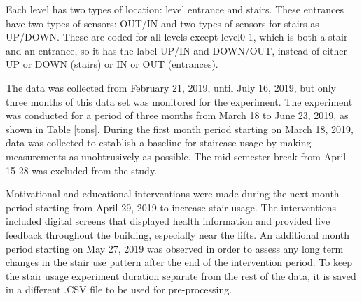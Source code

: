 Each level has two types of location: level entrance and stairs. These entrances have two types of sensors: OUT/IN and two types of sensors for stairs as UP/DOWN. These are coded for all levels except level0-1, which is both a stair and an entrance, so it has the label UP/IN and DOWN/OUT, instead of either UP or DOWN (stairs) or IN or OUT (entrances).



The data was collected from February 21, 2019, until July 16, 2019, but only three months of this data set was monitored for the experiment. The experiment was conducted for a period of three months from March 18 to June 23, 2019, as shown in Table \ref{tons}. During the first month period starting on March 18, 2019, data was collected to establish a baseline for staircase usage by making measurements as unobtrusively as possible. The mid-semester break from April 15-28 was excluded from the study. 

Motivational and educational interventions were made during the next month period starting from April 29, 2019 to increase stair usage. The interventions included digital screens that displayed health information and provided live feedback throughout the building, especially near the lifts. An additional month period starting on May 27, 2019 was observed in order to assess any long term changes in the stair use pattern after the end of the intervention period. To keep the stair usage experiment duration separate from the rest of the data, it is saved in a different .CSV file to be used for pre-processing. 


